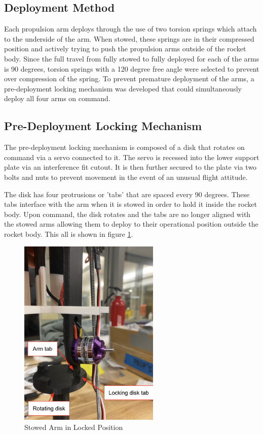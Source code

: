 \subsection{Deployment Method}
Each propulsion arm deploys through the use of two torsion springs which attach to the underside of the arm. When stowed, these springs are in their compressed position and actively trying to push the propulsion arms outside of the rocket body. Since the full travel from fully stowed to fully deployed for each of the arms is 90 degrees, torsion springs with a 120 degree free angle were selected to prevent over compression of the spring. To prevent premature deployment of the arms, a pre-deployment locking mechanism was developed that could simultaneously deploy all four arms on command.

\subsection{Pre-Deployment Locking Mechanism}
The pre-deployment locking mechanism is composed of a disk that rotates on command via a servo connected to it. The servo is recessed into the lower support plate via an interference fit cutout. It is then further secured to the plate via two bolts and nuts to prevent movement in the event of an unusual flight attitude. 

The disk has four protrusions or 'tabs' that are spaced every 90 degrees. These tabs interface with the arm when it is stowed in order to hold it inside the rocket body. Upon command, the disk rotates and the tabs are no longer aligned with the stowed arms allowing them to deploy to their operational position outside the rocket body. This all is shown in figure \ref{fig:stowedarm}.

\begin{figure}[H]
    \centering
    \includegraphics[width=0.6\textwidth]{src/figs/stowedarmlabeledview2.png}
    \caption{Stowed Arm in Locked Position}
    \label{fig:stowedarm}
\end{figure}


